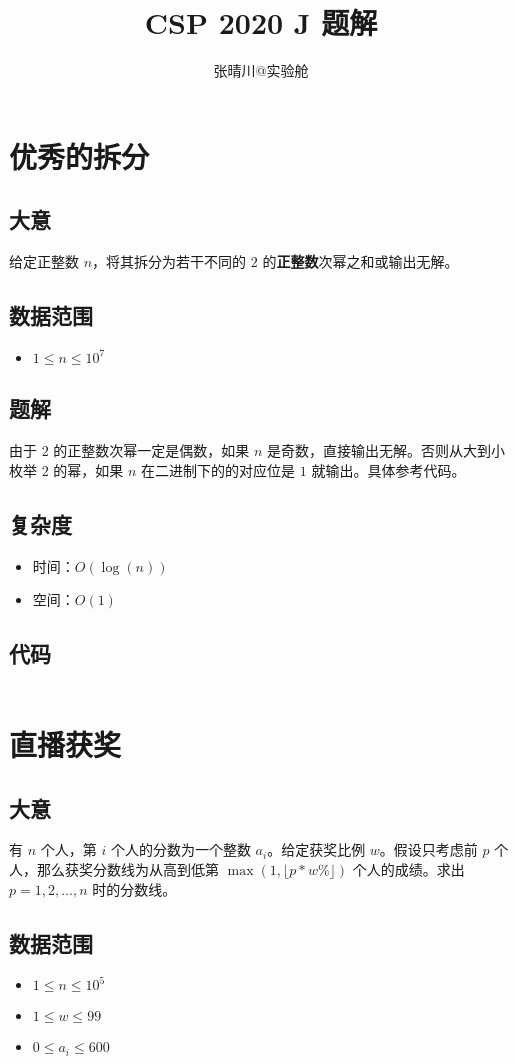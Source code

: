\documentclass{article}
\title{CSP 2020 J 题解}
\author{张晴川@实验舱}
\begin{document}
\maketitle
\section{优秀的拆分}
\subsection*{大意}
给定正整数 $n$，将其拆分为若干不同的 $2$ 的\textbf{正整数}次幂之和或输出无解。
\subsection*{数据范围}
\begin{itemize}
\item $1\le n \le 10^7$
\end{itemize}
\subsection*{题解}
由于 $2$ 的正整数次幂一定是偶数，如果 $n$ 是奇数，直接输出无解。否则从大到小枚举 $2$ 的幂，如果 $n$ 在二进制下的的对应位是 $1$ 就输出。具体参考代码。
\subsection*{复杂度}
\begin{itemize}
\item 时间：$O(\log(n))$
\item 空间：$O(1) $
\end{itemize}
\subsection*{代码}
\inputminted[linenos,autogobble]{cpp}{T1.cpp}


\section{直播获奖}
\subsection*{大意}
有 $n$ 个人，第 $i$ 个人的分数为一个整数 $a_i$。给定获奖比例 $w$。假设只考虑前 $p$ 个人，那么获奖分数线为从高到低第 $\max(1,\lfloor p*w\% \rfloor)$ 个人的成绩。求出 $p = 1,2,\ldots,n$ 时的分数线。

\subsection*{数据范围}
\begin{itemize}
\item $1\le n\le 10^5$
\item $1\le w \le 99$
\item $0\le a_i \le 600$
\end{itemize}
\end{document}
